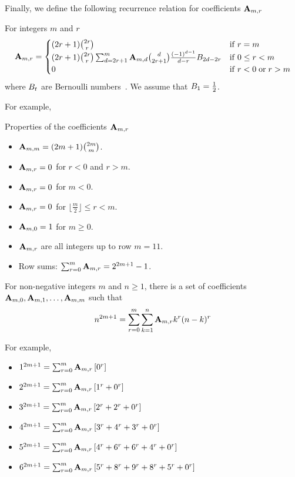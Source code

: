 Finally, we define the following recurrence relation for coefficients ${\mathbf{A}} \sb{m,r}$
\begin{proposition}
    For integers $m$ and $r$
    \label{prop:coefficients_a}
    \begin{align*}
        {\mathbf{A}} \sb{m,r} =
        \begin{cases}
        (2r+1)
            \binom{2r}{r} & \mathrm{if} \; r=m \\
            (2r+1) \binom{2r}{r} \sum_{d = 2r+1}^{m} {\mathbf{A}} \sb{m,d} \binom{d}{2r+1} \frac{(-1)^{d-1}}{d-r}
            {B}\sb{2d-2r} & \mathrm{if} \; 0 \leq r<m \\
            0 & \mathrm{if} \; r<0 \; \mathrm{or} \; r>m
        \end{cases}
    \end{align*}
    where ${B}\sb{t}$ are Bernoulli numbers~\cite{weisstein2002bernoulli}.
    We assume that ${B}\sb{1}=\frac{1}{2}$.
\end{proposition}
For example,

Properties of the coefficients ${\mathbf{A}} \sb{m,r}$
\begin{itemize}
    \item ${\mathbf{A}} \sb{m,m} = (2m+1)\binom{2m}{m}$.
    \item ${\mathbf{A}} \sb{m,r} = 0$ for $r < 0$ and $r > m$.
    \item ${\mathbf{A}} \sb{m,r} = 0$ for $m < 0$.
    \item ${\mathbf{A}} \sb{m,r} = 0$ for $\lfloor \frac{m}{2} \rfloor \leq r < m$.
    \item ${\mathbf{A}} \sb{m,0} = 1$ for $m \geq 0$.
    \item ${\mathbf{A}} \sb{m,r}$ are all integers up to row $m = 11$.
    \item Row sums: $\sum_{r=0}^{m} {\mathbf{A}} \sb{m,r} = 2^{2m+1} - 1$.
\end{itemize}
\begin{proposition}
    \label{prop:odd-power-identity}
    For non-negative integers $m$ and $n \geq 1$,
    there is a set of coefficients ${\mathbf{A}} \sb{m,0}, {\mathbf{A}} \sb{m,1}, \ldots, {\mathbf{A}} \sb{m,m}$ such that
    \begin{align*}
        n^{2m+1} = \sum_{r=0}^{m} \sum_{k=1}^{n} {\mathbf{A}} \sb{m,r} k^r (n-k)^r
    \end{align*}
\end{proposition}
For example,
\begin{itemize}
    \item $1^{2m+1} = \sum_{r=0}^{m} {\mathbf{A}} \sb{m,r} \left[ 0^r  \right]$
    \item $2^{2m+1} = \sum_{r=0}^{m} {\mathbf{A}} \sb{m,r} \left[ 1^r + 0^r  \right]$
    \item $3^{2m+1} = \sum_{r=0}^{m} {\mathbf{A}} \sb{m,r} \left[ 2^r + 2^r + 0^r  \right]$
    \item $4^{2m+1} = \sum_{r=0}^{m} {\mathbf{A}} \sb{m,r} \left[ 3^r + 4^r + 3^r + 0^r  \right]$
    \item $5^{2m+1} = \sum_{r=0}^{m} {\mathbf{A}} \sb{m,r} \left[ 4^r + 6^r + 6^r + 4^r + 0^r  \right]$
    \item $6^{2m+1} = \sum_{r=0}^{m} {\mathbf{A}} \sb{m,r} \left[ 5^r + 8^r + 9^r + 8^r + 5^r + 0^r  \right]$
\end{itemize}
